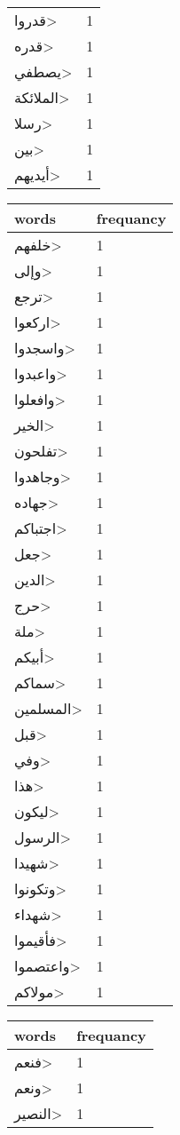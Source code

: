 \documentclass{article}
\begin{document}
\begin{multicols}{3}
\begin{center}
\begin{tabular}{ P{2cm}  P{1cm}}
\<قدروا> & 1 \\ 
\<قدره> & 1 \\ 
\<يصطفي> & 1 \\ 
\<الملائكة> & 1 \\ 
\<رسلا> & 1 \\ 
\<بين> & 1 \\ 
\<أيديهم> & 1 \\ 
\end{tabular} 
\begin{tabular}{ P{2cm}  P{1cm}} 
\textbf{words}    & \textbf{frequancy}  \\
\hline
\<خلفهم> & 1 \\ 
\<وإلى> & 1 \\ 
\<ترجع> & 1 \\ 
\<اركعوا> & 1 \\ 
\<واسجدوا> & 1 \\ 
\<واعبدوا> & 1 \\ 
\<وافعلوا> & 1 \\ 
\<الخير> & 1 \\ 
\<تفلحون> & 1 \\ 
\<وجاهدوا> & 1 \\ 
\<جهاده> & 1 \\ 
\<اجتباكم> & 1 \\ 
\<جعل> & 1 \\ 
\<الدين> & 1 \\ 
\<حرج> & 1 \\ 
\<ملة> & 1 \\ 
\<أبيكم> & 1 \\ 
\<سماكم> & 1 \\ 
\<المسلمين> & 1 \\ 
\<قبل> & 1 \\ 
\<وفي> & 1 \\ 
\<هذا> & 1 \\ 
\<ليكون> & 1 \\ 
\<الرسول> & 1 \\ 
\<شهيدا> & 1 \\ 
\<وتكونوا> & 1 \\ 
\<شهداء> & 1 \\ 
\<فأقيموا> & 1 \\ 
\<واعتصموا> & 1 \\ 
\<مولاكم> & 1 \\ 
\end{tabular} 
\begin{tabular}{ P{2cm}  P{1cm}} 
\textbf{words}    & \textbf{frequancy}  \\
\hline 
\<فنعم> & 1 \\ 
\<ونعم> & 1 \\ 
\<النصير> & 1 \\ 
\end{tabular} 
\end{center}
\end{multicols}
\end{document}
